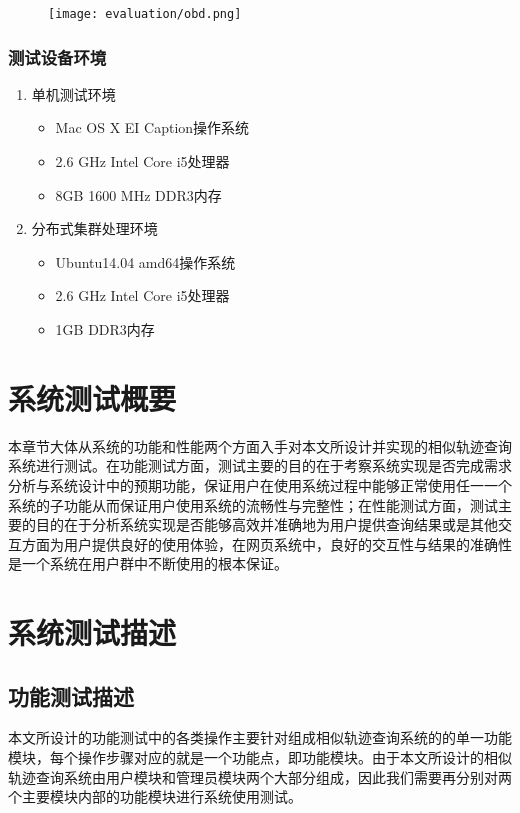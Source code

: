 \begin{figure}[!htp]
  \centering
  \texttt{[image: evaluation/obd.png]}
\end{figure}


\subsubsection{测试设备环境}
\label{subsubsec:device}
\begin{enumerate}
	\item 单机测试环境
	\begin{itemize}
		\item Mac OS X EI Caption操作系统
		\item 2.6 GHz Intel Core i5处理器
		\item 8GB 1600 MHz DDR3内存
	\end{itemize}
	\item 分布式集群处理环境
	\begin{itemize}
		\item Ubuntu14.04 amd64操作系统
		\item 2.6 GHz Intel Core i5处理器
		\item 1GB DDR3内存
	\end{itemize}
\end{enumerate}

\section{系统测试概要}
\label{sec:general description}
本章节大体从系统的功能和性能两个方面入手对本文所设计并实现的相似轨迹查询系统进行测试。在功能测试方面，测试主要的目的在于考察系统实现是否完成需求分析与系统设计中的预期功能，保证用户在使用系统过程中能够正常使用任一一个系统的子功能从而保证用户使用系统的流畅性与完整性；在性能测试方面，测试主要的目的在于分析系统实现是否能够高效并准确地为用户提供查询结果或是其他交互方面为用户提供良好的使用体验，在网页系统中，良好的交互性与结果的准确性是一个系统在用户群中不断使用的根本保证。

\section{系统测试描述}
\label{sec:function test}

\subsection{功能测试描述}
\label{subsec:function test description}
本文所设计的功能测试中的各类操作主要针对组成相似轨迹查询系统的的单一功能模块，每个操作步骤对应的就是一个功能点，即功能模块。由于本文所设计的相似轨迹查询系统由用户模块和管理员模块两个大部分组成，因此我们需要再分别对两个主要模块内部的功能模块进行系统使用测试。

